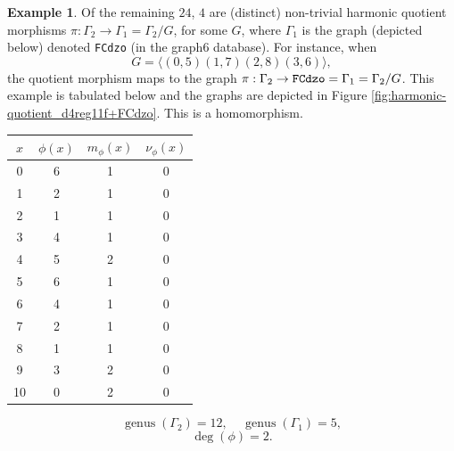 \documentclass[12pt,letterpaper]{article}
\theoremstyle{definition}
\newtheorem{example}[theorem]{Example}
\DeclareMathOperator{\genus}{genus}
\begin{document}
\begin{example}
{Of the remaining $24$, $4$ are (distinct)
non-trivial harmonic quotient morphisms
$\pi: \Gamma_2\to \Gamma_1=\Gamma_2/G$, for some $G$, where
$\Gamma_1$ is the graph (depicted below) denoted
{\tt FCdzo} (in the graph6 database).
For instance, when
\[
G = \langle  (0,5)(1,7)(2,8)(3,6)\rangle ,
\]
the quotient morphism maps to the  graph
$\pi: \Gamma_2\to {\tt FCdzo}=\Gamma_1=\Gamma_2/G $. This example
is tabulated below and the graphs are depicted in
Figure \ref{fig:harmonic-quotient_d4reg11f+FCdzo}.
This is a homomorphism.

\begin{center}
\begin{tabular}{c|c|c|c}  
  $x$ & $\phi(x)$ & $m_\phi(x)$ & $\nu_\phi(x)$ \\ \hline
  0   &    6   &        1         &  0   \\ 
  1   &    2   &        1         &  0  \\ 
  2   &    1   &        1         &  0  \\ 
  3   &    4   &        1         &  0  \\ 
  4   &    5   &        2         &  0   \\
  5   &    6   &        1         &  0   \\
  6   &    4   &        1         &  0   \\
  7   &    2   &        1         &  0   \\
  8   &    1   &        1         &  0   \\
  9   &    3   &        2         &  0   \\
  10   &   0   &        2         &  0  \\   
\end{tabular}
\end{center}

\[
  \genus(\Gamma_2) =12,\ \ \ \ \
  \genus(\Gamma_1) =5,
\]
\[
\deg(\phi) =2.
\]

}
\end{example}
\end{document}
